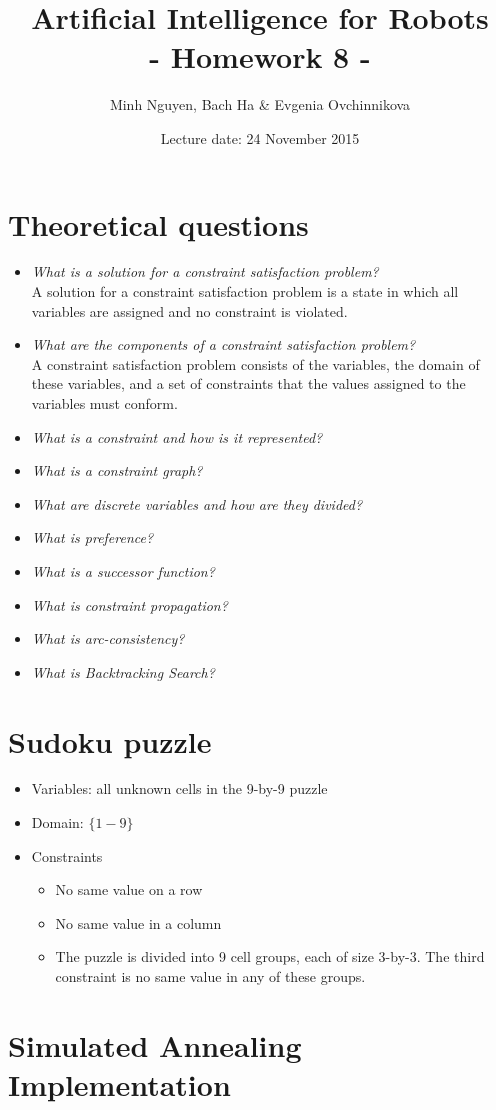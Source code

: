 \documentclass[a4paper, 12pt]{article}
\title{Artificial Intelligence for Robots \\
				- Homework 8 -}
\author{Minh Nguyen, Bach Ha \& Evgenia Ovchinnikova}
\date{Lecture date: 24 November 2015}
\begin{document}
\maketitle

\section{Theoretical questions}

    \begin{itemize}
        \item \emph{What is a solution for a constraint satisfaction problem?}\\
            A solution for a constraint satisfaction problem is a state in which
            all variables are assigned and no constraint is violated.
        \item \emph{What are the components of a constraint satisfaction problem?}\\
            A constraint satisfaction problem consists of the variables, the
            domain of these variables, and a set of constraints that the values
            assigned to the variables must conform.
        \item \emph{What is a constraint and how is it represented?}
        \item \emph{What is a constraint graph?}
        \item \emph{What are discrete variables and how are they divided?}
        \item \emph{What is preference?}
        \item \emph{What is a successor function?}
        \item \emph{What is constraint propagation?}
        \item \emph{What is arc-consistency?}
        \item \emph{What is Backtracking Search?}
    \end{itemize}

\section{Sudoku puzzle}

\begin{itemize}
    \item Variables: all unknown cells in the 9-by-9 puzzle

	\item Domain: $\{1-9\}$

    \item Constraints
    \begin{itemize}
        \item No same value on a row
        \item No same value in a column
        \item The puzzle is divided into 9 cell groups, each of size 3-by-3. The
        third constraint is no same value in any of these groups.
    \end{itemize}
\end{itemize}

\section{Simulated Annealing Implementation}
\end{document}
